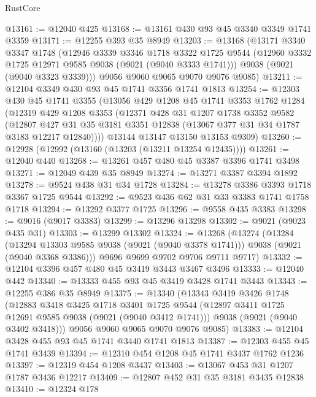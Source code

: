 \begin{lexlean}{RustCore}
\begin{coremodule}
@13161 := @12040 @425
@13168 := @13161 @430 @93 @45 @3340 @3349 @1741 @3359
@13171 := @12255 @393 @35 @8949
@13203 := @13168
    (@13171
      @3340
      @3347
      @1748
      (@12946
        @3339
        @3346
        @1718
        @3322
        @1725
        @9544
        (@12960 @3332 @1725 @12971 @9585 @9038 (@9021 (@9040 @3333 @1741)))
        @9038
        (@9021 (@9040 @3323 @3339)))
      @9056
      @9060
      @9065
      @9070
      @9076
      @9085)
@13211 := @12104 @3349 @430 @93 @45 @1741 @3356 @1741 @1813
@13254 := @12303
    @430
    @45
    @1741
    @3355
    (@13056
      @429
      @1208
      @45
      @1741
      @3353
      @1762
      @1284
      (@12319
        @429
        @1208
        @3353
        (@12371
          @428
          @31
          @1207
          @1738
          @3352
          @9582
          (@12807 @427 @31 @35 @3181 @3351 @12838 (@13067 @377 @31 @34 @1787 @3183 @12217 @12840))))
      @13144
      @13147
      @13150
      @13153
      @9309)
@13260 := @12928 (@12992 (@13160 (@13203 (@13211 @13254 @12435))))
@13261 := @12040 @440
@13268 := @13261 @457 @480 @45 @3387 @3396 @1741 @3498
@13271 := @12049 @439 @35 @8949
@13274 := @13271 @3387 @3394 @1892
@13278 := @9524 @438 @31 @34 @1728
@13284 := @13278 @3386 @3393 @1718 @3367 @1725 @9544
@13292 := @9523 @436 @62 @31 @33 @3383 @1741 @1758 @1718
@13294 := @13292 @3377 @1725
@13296 := @9558 @435 @3383
@13298 := @9016 (@9017 @3383)
@13299 := @13296 @13298
@13302 := @9021 (@9023 @435 @31)
@13303 := @13299 @13302
@13324 := @13268
    (@13274
      (@13284
        (@13294 @13303 @9585 @9038 (@9021 (@9040 @3378 @1741)))
        @9038
        (@9021 (@9040 @3368 @3386)))
      @9696
      @9699
      @9702
      @9706
      @9711
      @9717)
@13332 := @12104 @3396 @457 @480 @45 @3419 @3443 @3467 @3496
@13333 := @12040 @442
@13340 := @13333 @455 @93 @45 @3419 @3428 @1741 @3443
@13343 := @12255 @386 @35 @8949
@13375 := @13340
    (@13343
      @3419
      @3426
      @1748
      (@12883
        @3418
        @3425
        @1718
        @3401
        @1725
        @9544
        (@12897 @3411 @1725 @12691 @9585 @9038 (@9021 (@9040 @3412 @1741)))
        @9038
        (@9021 (@9040 @3402 @3418)))
      @9056
      @9060
      @9065
      @9070
      @9076
      @9085)
@13383 := @12104 @3428 @455 @93 @45 @1741 @3440 @1741 @1813
@13387 := @12303 @455 @45 @1741 @3439
@13394 := @12310 @454 @1208 @45 @1741 @3437 @1762 @1236
@13397 := @12319 @454 @1208 @3437
@13403 := @13067 @453 @31 @1207 @1787 @3436 @12217
@13409 := @12807 @452 @31 @35 @3181 @3435 @12838
@13410 := @12324 @178

\end{coremodule}
\end{lexlean}
